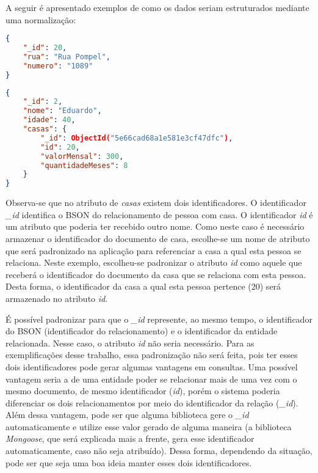 A seguir é apresentado exemplos de como os dados seriam estruturados mediante uma normalização:
    
\begin{lstlisting}[language=json, caption={Estrutura de Dados Normalizados de uma Casa}]
{
    "_id": 20,
    "rua": "Rua Pompel",
    "numero": "1089"
}
\end{lstlisting}
    
\begin{lstlisting}[language=json, caption={Estrutura de Dados Normalizados da Pessoa \textit{Eduardo}}]
{
    "_id": 2,
    "nome": "Eduardo",
    "idade": 40,
    "casas": {
        "_id": ObjectId("5e66cad68a1e581e3cf47dfc"),
        "id": 20,
        "valorMensal": 300,
        "quantidadeMeses": 8
    }
}
\end{lstlisting}

Observa-se que no atributo de \textit{casas} existem dois identificadores. O identificador \textit{\_id} identifica o BSON do relacionamento de pessoa com casa. O identificador \textit{id} é um atributo que poderia ter recebido outro nome. Como neste caso é necessário armazenar o identificador do documento de casa, escolhe-se um nome de atributo que será padronizado na aplicação para referenciar a casa a qual esta pessoa se relaciona. Neste exemplo, escolheu-se padronizar o atributo \textit{id} como aquele que receberá o identificador do documento da casa que se relaciona com esta pessoa. Desta forma, o identificador da casa a qual esta pessoa pertence (20) será armazenado no atributo \textit{id}. 

É possível padronizar para que o \textit{\_id} represente, ao mesmo tempo, o identificador do BSON (identificador do relacionamento) e o identificador da entidade relacionada. Nesse caso, o atributo \textit{id} não seria necessário. Para as exemplificações desse trabalho, essa padronização não será feita, pois ter esses dois identificadores pode gerar algumas vantagens em consultas. Uma possível vantagem seria a de uma entidade poder se relacionar mais de uma vez com o mesmo documento, de mesmo identificador (\textit{id}), porém o sistema poderia diferenciar os dois relacionamentos por meio do identificador da relação (\textit{\_id}). Além dessa vantagem, pode ser que alguma biblioteca gere o \textit{\_id} automaticamente e utilize esse valor gerado de alguma maneira (a biblioteca \textit{Mongoose}, que será explicada mais a frente, gera esse identificador automaticamente, caso não seja atribuído). Dessa forma, dependendo da situação, pode ser que seja uma boa ideia manter esses dois identificadores.
    
